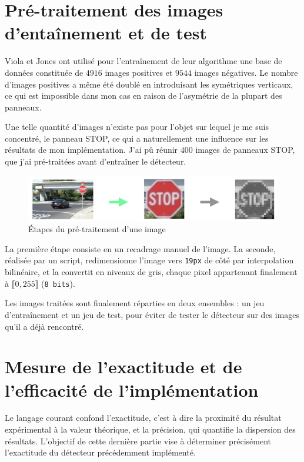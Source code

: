 \documentclass[12pt,a4paper]{article}
\begin{document}
\section{Pré-traitement des images d'entaînement et de test}
\label{sec:pre-traitement}
Viola et Jones ont utilisé pour l'entraînement de leur algorithme une base de données constituée de $4916$ images positives et $9544$ images négatives. Le nombre d'images positives a même été doublé en introduisant les symétriques verticaux, ce qui est impossible dans mon cas en raison de l'asymétrie de la plupart des panneaux. 

Une telle quantité d'images n'existe pas pour l'objet sur lequel je me suis concentré, le panneau STOP, ce qui a naturellement une influence sur les résultats de mon implémentation. J'ai pû réunir $400$ images de panneaux STOP, que j'ai pré-traitées avant d'entraîner le détecteur.

\begin{figure}[h]
    \includegraphics[scale = 0.5]{traitement}
    \centering
    \caption{Étapes du pré-traitement d'une image}
\end{figure}

La première étape consiste en un recadrage manuel de l'image. La seconde, réalisée par un script, redimensionne l'image vers \texttt{19px} de côté par interpolation bilinéaire, et la convertit en niveaux de gris, chaque pixel appartenant finalement à $\llbracket 0, 255 \rrbracket$ (\texttt{8 bits}).

Les images traitées sont finalement réparties en deux ensembles : un jeu d'entraînement et un jeu de test, pour éviter de tester le détecteur sur des images qu'il a déjà rencontré.

\section{Mesure de l'exactitude et de l'efficacité de l'implémentation}
Le langage courant confond l'exactitude, c'est à dire la proximité du résultat expérimental à la valeur théorique, et la précision, qui quantifie la dispersion des résultats. L'objectif de cette dernière partie vise à déterminer précisément l'exactitude du détecteur précédemment implémenté.
\end{document}
